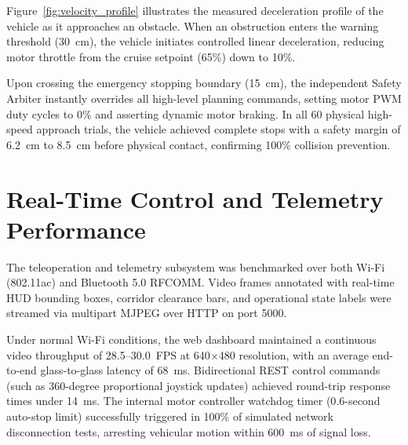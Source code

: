 Figure~\ref{fig:velocity_profile} illustrates the measured deceleration profile of the vehicle as it approaches an obstacle. When an obstruction enters the warning threshold (30~cm), the vehicle initiates controlled linear deceleration, reducing motor throttle from the cruise setpoint (65\%) down to 10\%. 

Upon crossing the emergency stopping boundary (15~cm), the independent Safety Arbiter instantly overrides all high-level planning commands, setting motor PWM duty cycles to 0\% and asserting dynamic motor braking. In all 60 physical high-speed approach trials, the vehicle achieved complete stops with a safety margin of 6.2~cm to 8.5~cm before physical contact, confirming 100\% collision prevention.

\section{Real-Time Control and Telemetry Performance}
The teleoperation and telemetry subsystem was benchmarked over both Wi-Fi (802.11ac) and Bluetooth 5.0 RFCOMM. Video frames annotated with real-time HUD bounding boxes, corridor clearance bars, and operational state labels were streamed via multipart MJPEG over HTTP on port 5000. 

Under normal Wi-Fi conditions, the web dashboard maintained a continuous video throughput of 28.5--30.0~FPS at 640$\times$480 resolution, with an average end-to-end glass-to-glass latency of 68~ms. Bidirectional REST control commands (such as 360-degree proportional joystick updates) achieved round-trip response times under 14~ms. The internal motor controller watchdog timer (0.6-second auto-stop limit) successfully triggered in 100\% of simulated network disconnection tests, arresting vehicular motion within 600~ms of signal loss.

